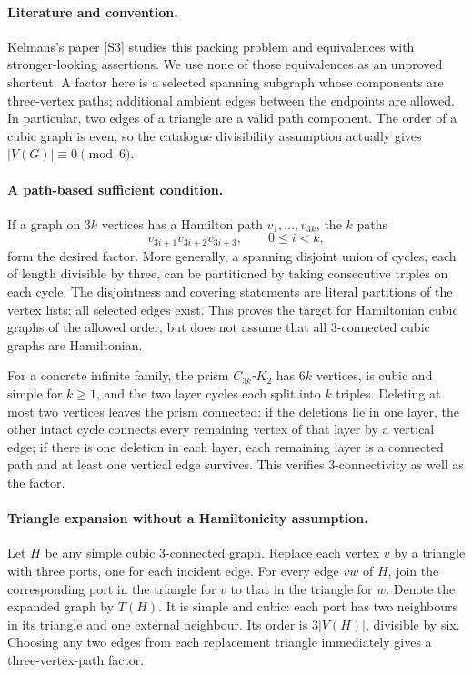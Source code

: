 \documentclass[11pt,a4paper]{article}
\begin{document}
\paragraph{Literature and convention.}
Kelmans's paper [S3] studies this packing problem and equivalences with stronger-looking assertions. We use none of those equivalences as an unproved shortcut. A factor here is a selected spanning subgraph whose components are three-vertex paths; additional ambient edges between the endpoints are allowed. In particular, two edges of a triangle are a valid path component. The order of a cubic graph is even, so the catalogue divisibility assumption actually gives $|V(G)|\equiv0\pmod6$.

\paragraph{A path-based sufficient condition.}
If a graph on $3k$ vertices has a Hamilton path $v_1,\ldots,v_{3k}$, the $k$ paths
\[
 v_{3i+1}v_{3i+2}v_{3i+3},\qquad0\le i<k,
\]
form the desired factor. More generally, a spanning disjoint union of cycles, each of length divisible by three, can be partitioned by taking consecutive triples on each cycle. The disjointness and covering statements are literal partitions of the vertex lists; all selected edges exist. This proves the target for Hamiltonian cubic graphs of the allowed order, but does not assume that all 3-connected cubic graphs are Hamiltonian.

For a concrete infinite family, the prism $C_{3k}\square K_2$ has $6k$ vertices, is cubic and simple for $k\ge1$, and the two layer cycles each split into $k$ triples. Deleting at most two vertices leaves the prism connected: if the deletions lie in one layer, the other intact cycle connects every remaining vertex of that layer by a vertical edge; if there is one deletion in each layer, each remaining layer is a connected path and at least one vertical edge survives. This verifies 3-connectivity as well as the factor.

\paragraph{Triangle expansion without a Hamiltonicity assumption.}
Let $H$ be any simple cubic 3-connected graph. Replace each vertex $v$ by a triangle with three ports, one for each incident edge. For every edge $vw$ of $H$, join the corresponding port in the triangle for $v$ to that in the triangle for $w$. Denote the expanded graph by $T(H)$. It is simple and cubic: each port has two neighbours in its triangle and one external neighbour. Its order is $3|V(H)|$, divisible by six. Choosing any two edges from each replacement triangle immediately gives a three-vertex-path factor.
\end{document}
